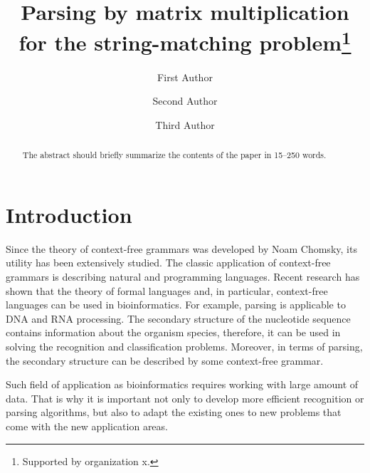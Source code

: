 \documentclass[runningheads]{llncs}
\begin{document}
%
\title{Parsing by matrix multiplication for the string-matching problem\thanks{Supported by organization x.}}
%
%
\author{First Author \and
Second Author \and
Third Author}
%
%
%
\maketitle              %
%
\begin{abstract}
The abstract should briefly summarize the contents of the paper in
15--250 words.

\end{abstract}
%
%
%
\section{Introduction}

Since the theory of context-free grammars was developed by Noam Chomsky, its utility has been extensively studied. The classic application of context-free grammars is describing natural and programming  languages. Recent  research  has  shown  that the theory of formal languages and, in particular, context-free languages can be used in bioinformatics. For example, parsing is applicable to DNA and RNA processing. The secondary structure of the nucleotide sequence contains information about the organism species, therefore, it can be used in solving the recognition and classification problems. Moreover, in terms of parsing, the secondary structure can be described by some context-free grammar.

Such field of application as bioinformatics requires working with large amount of data. That is why it is important not only to develop more efficient recognition or parsing algorithms, but also to adapt the existing ones to new problems that come with the new application areas.
\end{document}
